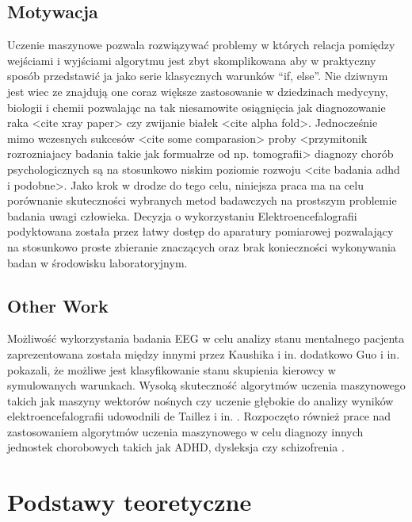 \documentclass{./assets/wfis}
\begin{document}
\section{Motywacja}
Uczenie maszynowe pozwala rozwiązywać problemy w których relacja pomiędzy wejściami i wyjściami algorytmu jest zbyt skomplikowana aby w praktyczny sposób przedstawić ja jako serie klasycznych warunków “if, else”. Nie dziwnym jest wiec ze znajdują one coraz większe zastosowanie w dziedzinach medycyny, biologii i chemii pozwalając na tak niesamowite osiągnięcia jak diagnozowanie raka <cite xray paper> czy zwijanie białek <cite alpha fold>. Jednocześnie mimo wczesnych sukcesów <cite some comparasion> proby <przymitonik rozrozniajacy badania takie jak formualrze od np. tomografii> diagnozy chorób psychologicznych są na stosunkowo niskim poziomie rozwoju <cite badania adhd i podobne>. Jako krok w drodze do tego celu, niniejsza praca ma na celu porównanie skuteczności wybranych metod badawczych na prostszym problemie badania uwagi człowieka. Decyzja o wykorzystaniu Elektroencefalografii podyktowana została przez łatwy dostęp do aparatury pomiarowej pozwalający na stosunkowo proste zbieranie znaczących oraz brak konieczności wykonywania badan w środowisku laboratoryjnym.

\section{Other Work}
Możliwość wykorzystania badania EEG w celu analizy stanu mentalnego pacjenta zaprezentowana została między innymi przez Kaushika i in. \cite{kaushik_decoding_2022} dodatkowo Guo i in. \cite{guo_detection_2018} pokazali, że możliwe jest klasyfikowanie stanu skupienia kierowcy w symulowanych warunkach. Wysoką skuteczność algorytmów uczenia maszynowego takich jak maszyny wektorów nośnych czy uczenie głębokie do analizy wyników elektroencefalografii udowodnili de Taillez i in. \cite{de_taillez_machine_2020}. Rozpoczęto również prace nad zastosowaniem algorytmów uczenia maszynowego w celu diagnozy innych jednostek chorobowych takich jak ADHD, dysleksja czy schizofrenia \cite{ahire_comprehensive_2022, joshi_review_2021, clarke_eeg_2002}.


\chapter{Podstawy teoretyczne}
\end{document}
